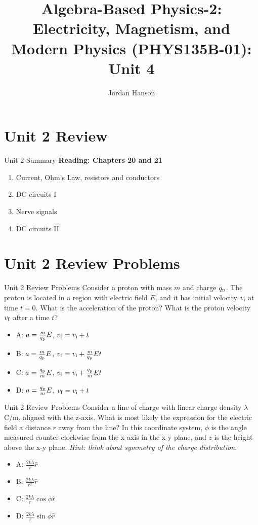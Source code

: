 \documentclass{beamer}
\title{Algebra-Based Physics-2: Electricity, Magnetism, and Modern Physics (PHYS135B-01): Unit 4}
\author{Jordan Hanson}
\institute{Whittier College Department of Physics and Astronomy}
\begin{document}
\maketitle

\section{Unit 2 Review}

\begin{frame}{Unit 2 Summary}
\textbf{Reading: Chapters 20 and 21}
\begin{enumerate}
\item Current, Ohm's Law, resistors and conductors
\item DC circuits I
\item Nerve signals
\item \alert{DC circuits II}
\end{enumerate}
\end{frame}

\section{Unit 2 Review Problems}

\begin{frame}{Unit 2 Review Problems}
Consider a proton with mass $m$ and charge $q_{\rm p}$.  The proton is located in a region with electric field $E$, and it has initial velocity $v_{\rm i}$ at time $t = 0$.  What is the acceleration of the proton?  What is the proton velocity $v_{\rm f}$ after a time $t$?
\begin{itemize}
\item A: $a = \frac{m}{q_{\rm p}} E$, $v_{\rm f}=v_{\rm i}+t$
\item B: $a = \frac{m}{q_{\rm p}} E$, $v_{\rm f}=v_{\rm i}+\frac{m}{q_{\rm p}} E t$
\item C: $a = \frac{q_{\rm p}}{m} E$, $v_{\rm f}=v_{\rm i}+\frac{q_{\rm p}}{m} E t$
\item D: $a = \frac{q_{\rm p}}{m} E$, $v_{\rm f}=v_{\rm i}+t$
\end{itemize}
\end{frame}

\begin{frame}{Unit 2 Review Problems}
Consider a line of charge with linear charge density $\lambda$ C/m, aligned with the z-axis.  What is most likely the expression for the electric field a distance $r$ away from the line?  In this coordinate system, $\phi$ is the angle measured counter-clockwise from the x-axis in the x-y plane, and $z$ is the height above the x-y plane. \textit{Hint: think about symmetry of the charge distribution.}
\begin{itemize}
\item A: $\frac{2k\lambda}{r} \hat{r}$
\item B: $\frac{2k\lambda}{r^2} \hat{r}$
\item C: $\frac{2k\lambda}{r} \cos\phi \hat{r}$
\item D: $\frac{2k\lambda}{r} \sin\phi \hat{r}$
\end{itemize}
\end{frame}
\end{document}
